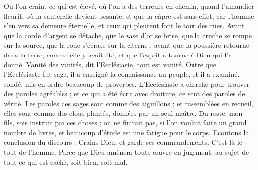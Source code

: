 \begin{multicols}{2}
Où l’on craint ce qui est élevé, où l’on a des terreurs en chemin, quand l'amandier fleurit, où la sauterelle devient pesante, et que la câpre est sans effet, car l'homme s'en vers sa demeure éternelle, et ceux qui pleurent font le tour des rues.
Avant que la corde d'argent se détache, que le vase d'or se brise, que la cruche se rompe sur la source, que la roue s’écrase sur la citerne ;
avant que la poussière retourne dans la terre, comme elle y avait été, et que l'esprit retourne à Dieu qui l'a donné.
Vanité des vanités, dit l'Ecclésiaste, tout est vanité.
Outre que l'Ecclésiaste fut sage, il a enseigné la connaissance au peuple, et il a examiné, sondé, mis en ordre beaucoup de proverbes.
L'Ecclésiaste a cherché pour trouver des paroles agréables ; et ce qui a été écrit avec droiture, ce sont des paroles de vérité.
Les paroles des sages sont comme des aiguillons ; et rassemblées en recueil, elles sont comme des clous plantés, données par un seul maître.
Du reste, mon fils, sois instruit par ces choses ; on ne finirait pas, si l’on voulait faire un grand nombre de livres, et beaucoup d'étude est une fatigue pour le corps.
Ecoutons la conclusion du discours : Crains Dieu, et garde ses commandements. C'est là le tout de l'homme.
Parce que Dieu amènera toute œuvre en jugement, au sujet de tout ce qui est caché, soit bien, soit mal.
\PPE{}
\end{multicols}
